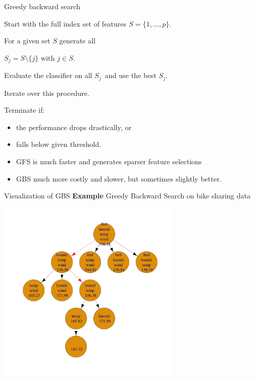 \documentclass[11pt,compress,t,notes=noshow, xcolor=table]{beamer}
\begin{document}
\begin{vbframe}{Greedy backward search}

    \begin{blocki}{}
      \item Start with the full index set of features $S = \{1, \ldots, p\}$.
      \item For a given set $S$ generate all

      $S_j = S \setminus\{j\}$ with $j \in S$.
      \item Evaluate the classifier on all $S_j$\
        and use the best $S_j$.
      \item Iterate over this procedure.
      \item Terminate if:
        \begin{itemize}
          \item the performance drops drastically, or
          \item falls below given threshold.
        \end{itemize}
      \end{blocki}

      \begin{itemize}
          \item GFS is much faster and generates sparser feature selections
          \item GBS much more costly and slower, but sometimes slightly better.
      \end{itemize}

  \end{vbframe}

  \begin{frame}{Visualization of GBS}
    \textbf{Example} Greedy Backward Search on bike sharing data
    \begin{center}
      \includegraphics[width = 0.65\textwidth]{figure/fs-wrappers-backwards-powerset-tree-4.png}
      \end{center}
\end{frame}
\end{document}
